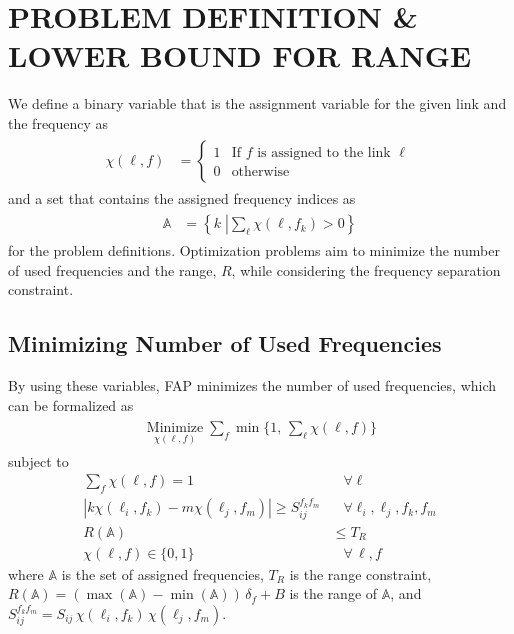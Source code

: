 \documentclass[10pt,twocolumn,twoside]{JCNtran}
\newcommand{\linkl}{\ell}
\newcommand{\freqsepQuantized}[2]{S_{#1#2}}
\newcommand{\freqshift}{\mbox{$\delta_{f}$}}
\newcommand{\funcAssignment}[2]{\chi(#1, #2)}
\newcommand{\setUsedFreq}{\mbox{$\mathbb{A}$}}
\newcommand{\rangefa}{R}
\newcommand{\bandw}{\mbox{$B$}}
\newcommand{\rangeConstraint}{T_{\rangefa}}
\newcommand{\freqsepQuantizedWithFreqs}[4]{S_{#1#2}^{#3#4}}
\begin{document}
\section{\uppercase{Problem Definition \& Lower Bound for Range}}
\label{sec_problem_definition}
We define a binary variable that is the assignment variable for the given link and the frequency as 
\begin{align}
\begin{split}
\funcAssignment{\linkl}{f} &=\left\{  
\begin{array}{ll}
1 & \mbox{If $f$ is assigned to the link $\linkl$}\\
0 & \mbox{otherwise}
\end{array} \right.
\end{split}
\end{align}
and a set that contains the assigned frequency indices as
\begin{align}
\begin{split}
\setUsedFreq &= \left\{ k \;\left| \sum\limits_{\linkl} \funcAssignment{\linkl}{f_k} > 0 \right. \right\}
\end{split}
\end{align}
for the problem definitions. Optimization problems aim to minimize the number of used frequencies and the range, $\rangefa$, while considering the frequency separation constraint. 


\subsection{Minimizing Number of Used Frequencies}
\label{subsec_min_used_freq}
By using these variables, FAP minimizes the number of used frequencies,  which can be formalized as
\begin{align}
\begin{split}
\mathop{\mbox{Minimize}}\limits_{\funcAssignment{\linkl}{f}} \sum\limits_{f} {\min \Bigg\{1, \,\sum\limits_{\linkl} \funcAssignment{\linkl}{f} \Bigg\}}
\end{split}
\end{align}
subject to
\begin{align}
\label{eq_link_requirement}
\sum\limits_{f} \funcAssignment{\linkl}{f} = 1  & \;\;\; \forall \linkl \\
\label{eq_separation_requirement}
| k\funcAssignment{\linkl_i}{f_k} - m\funcAssignment{\linkl_j}{f_m} | \geq \freqsepQuantizedWithFreqs{i}{j}{f_k}{f_m}  & \;\;\; \forall \linkl_i, \linkl_j, f_k, f_m \\
\rangefa(\setUsedFreq)  & \leq \rangeConstraint \\
\funcAssignment{\linkl}{f} \in \{0,1\}  &\;\;\; \forall \,\linkl, f
\end{align}
where $\setUsedFreq$ is the set of assigned frequencies, $\rangeConstraint$ is the range constraint, $\rangefa(\setUsedFreq) = (\max(\setUsedFreq{}) - \min(\setUsedFreq{})) \,\freqshift{} + \bandw$ is the range of $\setUsedFreq$, and $\freqsepQuantizedWithFreqs{i}{j}{f_k}{f_m} = \freqsepQuantized{i}{j}\,\funcAssignment{\linkl_i}{f_k}\,\funcAssignment{\linkl_j}{f_m}$.
\end{document}
